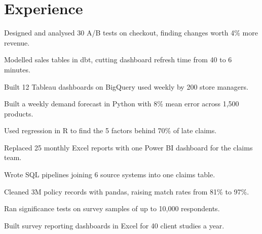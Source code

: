 \documentclass[]{deedy-resume-openfont}
\begin{document}
\begin{minipage}[t]{0.66\textwidth}

\section{Experience}
\vspace{\topsep} %
\begin{tightemize}
\item Designed and analysed 30 A/B tests on checkout, finding changes worth 4\% more revenue. %
\item Modelled sales tables in dbt, cutting dashboard refresh time from 40 to 6 minutes. %
\item Built 12 Tableau dashboards on BigQuery used weekly by 200 store managers. %
\item Built a weekly demand forecast in Python with 8\% mean error across 1,500 products. %
\end{tightemize}
\sectionsep
{}
\vspace{\topsep} %
\begin{tightemize}
\item Used regression in R to find the 5 factors behind 70\% of late claims. %
\item Replaced 25 monthly Excel reports with one Power BI dashboard for the claims team. %
\item Wrote SQL pipelines joining 6 source systems into one claims table. %
\item Cleaned 3M policy records with pandas, raising match rates from 81\% to 97\%. %
\end{tightemize}
\sectionsep
{}
\vspace{\topsep} %
\begin{tightemize}
\item Ran significance tests on survey samples of up to 10,000 respondents. %
\item Built survey reporting dashboards in Excel for 40 client studies a year. %
\end{tightemize}
\sectionsep


\end{minipage}
\end{document}
